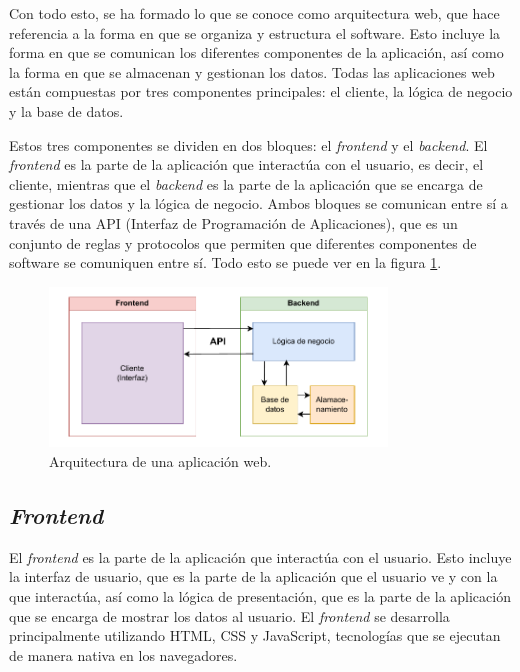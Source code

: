 Con todo esto, se ha formado lo que se conoce como arquitectura web, que hace referencia a la forma en que se organiza y estructura el software. Esto incluye la forma en que se comunican los diferentes componentes de la aplicación, así como la forma en que se almacenan y gestionan los datos. Todas las aplicaciones web están compuestas por tres componentes principales: el cliente, la lógica de negocio y la base de datos.

Estos tres componentes se dividen en dos bloques: el \textit{frontend} y el \textit{backend}. El \textit{frontend} es la parte de la aplicación que interactúa con el usuario, es decir, el cliente, mientras que el \textit{backend} es la parte de la aplicación que se encarga de gestionar los datos y la lógica de negocio. Ambos bloques se comunican entre sí a través de una API (Interfaz de Programación de Aplicaciones), que es un conjunto de reglas y protocolos que permiten que diferentes componentes de software se comuniquen entre sí. Todo esto se puede ver en la figura \ref{fig:arquitectura_web}.

\begin{figure}
    \centering
    \includegraphics[width=0.8\textwidth]{figures/theoric_frame/arquitectura_web.pdf}
    \caption{Arquitectura de una aplicación web.}
    \label{fig:arquitectura_web}
\end{figure}

\subsection{\textit{Frontend}}

El \textit{frontend} es la parte de la aplicación que interactúa con el usuario. Esto incluye la interfaz de usuario, que es la parte de la aplicación que el usuario ve y con la que interactúa, así como la lógica de presentación, que es la parte de la aplicación que se encarga de mostrar los datos al usuario. El \textit{frontend} se desarrolla principalmente utilizando HTML, CSS y JavaScript, tecnologías que se ejecutan de manera nativa en los navegadores.

